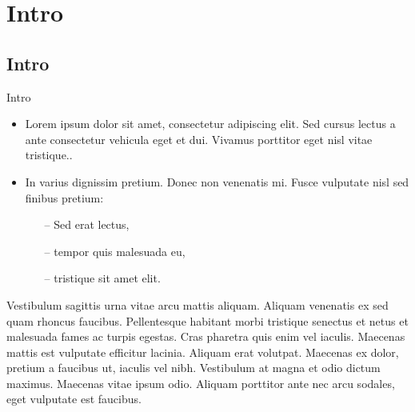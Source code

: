 \section[Intro]{Intro}

\subsection[Intro]{Intro}

\begin{frame}
	\begin{block}{Intro}
		\begin{itemize}
				\item Lorem ipsum dolor sit amet, consectetur adipiscing elit. Sed cursus lectus a ante consectetur vehicula eget et dui. Vivamus porttitor eget nisl vitae tristique..
				\item In varius dignissim pretium. Donec non venenatis mi. Fusce vulputate nisl sed finibus pretium:
					\begin{itemize}
						\item[--] Sed erat lectus,
						\item[--] tempor quis malesuada eu, 
						\item[--] tristique sit amet elit.
					\end{itemize}
			\end{itemize}
		Vestibulum sagittis urna vitae arcu mattis aliquam. Aliquam venenatis ex sed quam rhoncus faucibus. Pellentesque habitant morbi tristique senectus et netus et malesuada fames ac turpis egestas. Cras pharetra quis enim vel iaculis. Maecenas mattis est vulputate efficitur lacinia. Aliquam erat volutpat. Maecenas ex dolor, pretium a faucibus ut, iaculis vel nibh. Vestibulum at magna et odio dictum maximus. Maecenas vitae ipsum odio. Aliquam porttitor ante nec arcu sodales, eget vulputate est faucibus.
	\end{block}
\end{frame}